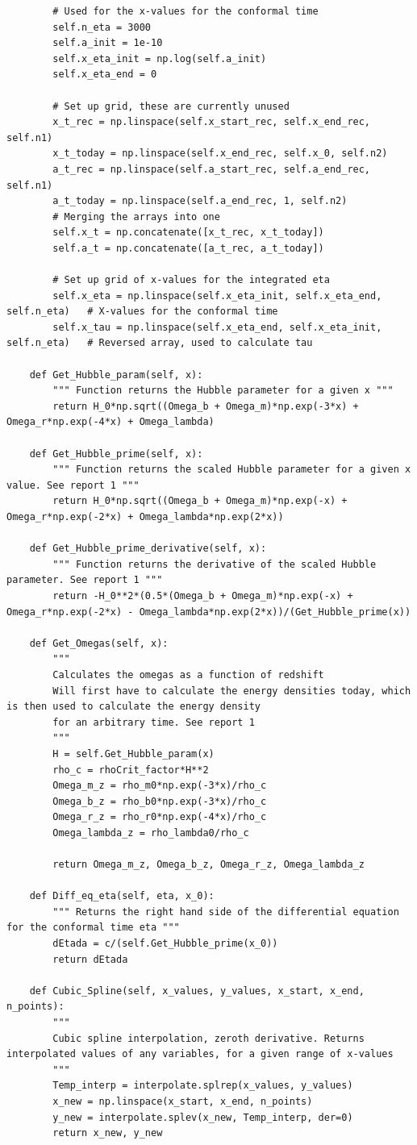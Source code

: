 \documentclass[12pt]{article}
\begin{document}
\begin{lstlisting}
		# Used for the x-values for the conformal time
		self.n_eta = 3000
		self.a_init = 1e-10
		self.x_eta_init = np.log(self.a_init)
		self.x_eta_end = 0

		# Set up grid, these are currently unused
		x_t_rec = np.linspace(self.x_start_rec, self.x_end_rec, self.n1)
		x_t_today = np.linspace(self.x_end_rec, self.x_0, self.n2)
		a_t_rec = np.linspace(self.a_start_rec, self.a_end_rec, self.n1)
		a_t_today = np.linspace(self.a_end_rec, 1, self.n2)
		# Merging the arrays into one
		self.x_t = np.concatenate([x_t_rec, x_t_today])
		self.a_t = np.concatenate([a_t_rec, a_t_today])

		# Set up grid of x-values for the integrated eta
		self.x_eta = np.linspace(self.x_eta_init, self.x_eta_end, self.n_eta)	# X-values for the conformal time
		self.x_tau = np.linspace(self.x_eta_end, self.x_eta_init, self.n_eta)	# Reversed array, used to calculate tau

	def Get_Hubble_param(self, x):
		""" Function returns the Hubble parameter for a given x """
		return H_0*np.sqrt((Omega_b + Omega_m)*np.exp(-3*x) + Omega_r*np.exp(-4*x) + Omega_lambda)

	def Get_Hubble_prime(self, x):
		""" Function returns the scaled Hubble parameter for a given x value. See report 1 """
		return H_0*np.sqrt((Omega_b + Omega_m)*np.exp(-x) + Omega_r*np.exp(-2*x) + Omega_lambda*np.exp(2*x))

	def Get_Hubble_prime_derivative(self, x):
		""" Function returns the derivative of the scaled Hubble parameter. See report 1 """
		return -H_0**2*(0.5*(Omega_b + Omega_m)*np.exp(-x) + Omega_r*np.exp(-2*x) - Omega_lambda*np.exp(2*x))/(Get_Hubble_prime(x))

	def Get_Omegas(self, x):
		""" 
		Calculates the omegas as a function of redshift
		Will first have to calculate the energy densities today, which is then used to calculate the energy density
		for an arbitrary time. See report 1
		"""
		H = self.Get_Hubble_param(x)
		rho_c = rhoCrit_factor*H**2
		Omega_m_z = rho_m0*np.exp(-3*x)/rho_c
		Omega_b_z = rho_b0*np.exp(-3*x)/rho_c
		Omega_r_z = rho_r0*np.exp(-4*x)/rho_c
		Omega_lambda_z = rho_lambda0/rho_c

		return Omega_m_z, Omega_b_z, Omega_r_z, Omega_lambda_z

	def Diff_eq_eta(self, eta, x_0):
		""" Returns the right hand side of the differential equation for the conformal time eta """
		dEtada = c/(self.Get_Hubble_prime(x_0))
		return dEtada

	def Cubic_Spline(self, x_values, y_values, x_start, x_end, n_points):
		""" 
		Cubic spline interpolation, zeroth derivative. Returns interpolated values of any variables, for a given range of x-values
		"""
		Temp_interp = interpolate.splrep(x_values, y_values)
		x_new = np.linspace(x_start, x_end, n_points)
		y_new = interpolate.splev(x_new, Temp_interp, der=0)
		return x_new, y_new


\end{lstlisting}
\end{document}
